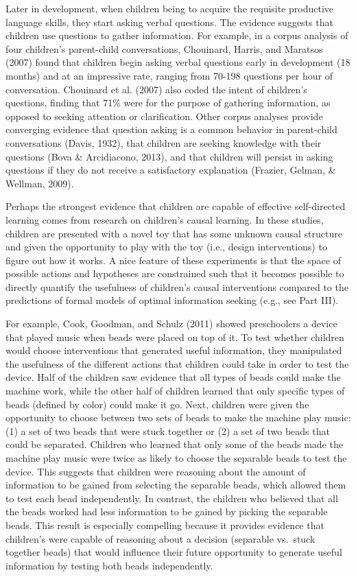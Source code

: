 \documentclass[english,floatsintext,man]{apa6}
\theoremstyle{definition}
\theoremstyle{definition}
\theoremstyle{definition}
\theoremstyle{remark}
\begin{document}
Later in development, when children being to acquire the requisite
productive language skills, they start asking verbal questions. The
evidence suggests that children use questions to gather information. For
example, in a corpus analysis of four children's parent-child
conversations, Chouinard, Harris, and Maratsos (2007) found that
children begin asking verbal questions early in development (18 months)
and at an impressive rate, ranging from 70-198 questions per hour of
conversation. Chouinard et al. (2007) also coded the intent of
children's questions, finding that 71\% were for the purpose of
gathering information, as opposed to seeking attention or clarification.
Other corpus analyses provide converging evidence that question asking
is a common behavior in parent-child conversations (Davis, 1932), that
children are seeking knowledge with their questions (Bova \&
Arcidiacono, 2013), and that children will persist in asking questions
if they do not receive a satisfactory explanation (Frazier, Gelman, \&
Wellman, 2009).

Perhaps the strongest evidence that children are capable of effective
self-directed learning comes from research on children's causal
learning. In these studies, children are presented with a novel toy that
has some unknown causal structure and given the opportunity to play with
the toy (i.e., design interventions) to figure out how it works. A nice
feature of these experiments is that the space of possible actions and
hypotheses are constrained such that it becomes possible to directly
quantify the usefulness of children's causal interventions compared to
the predictions of formal models of optimal information seeking (e.g.,
see Part III).

For example, Cook, Goodman, and Schulz (2011) showed preschoolers a
device that played music when beads were placed on top of it. To test
whether children would choose interventions that generated useful
information, they manipulated the usefulness of the different actions
that children could take in order to test the device. Half of the
children saw evidence that all types of beads could make the machine
work, while the other half of children learned that only specific types
of beads (defined by color) could make it go. Next, children were given
the opportunity to choose between two sets of beads to make the machine
play music: (1) a set of two beads that were stuck together or (2) a set
of two beads that could be separated. Children who learned that only
some of the beads made the machine play music were twice as likely to
choose the separable beads to test the device. This suggests that
children were reasoning about the amount of information to be gained
from selecting the separable beads, which allowed them to test each bead
independently. In contrast, the children who believed that all the beads
worked had less information to be gained by picking the separable beads.
This result is especially compelling because it provides evidence that
children's were capable of reasoning about a decision (separable
vs.~stuck together beads) that would influence their future opportunity
to generate useful information by testing both beads independently.
\end{document}
